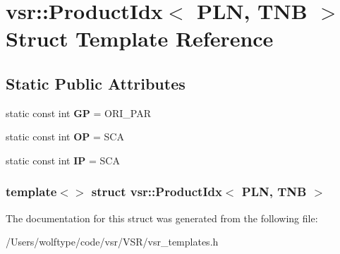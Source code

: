 \hypertarget{structvsr_1_1_product_idx_3_01_p_l_n_00_01_t_n_b_01_4}{\section{vsr\-:\-:Product\-Idx$<$ P\-L\-N, T\-N\-B $>$ Struct Template Reference}
\label{structvsr_1_1_product_idx_3_01_p_l_n_00_01_t_n_b_01_4}
}
\subsection*{Static Public Attributes}
\begin{DoxyCompactItemize}
\item 
\hypertarget{structvsr_1_1_product_idx_3_01_p_l_n_00_01_t_n_b_01_4_a2cfb0f629a8afe4cf45a4ff998809194}{static const int {\bfseries G\-P} = O\-R\-I\-\_\-\-P\-A\-R}\label{structvsr_1_1_product_idx_3_01_p_l_n_00_01_t_n_b_01_4_a2cfb0f629a8afe4cf45a4ff998809194}

\item 
\hypertarget{structvsr_1_1_product_idx_3_01_p_l_n_00_01_t_n_b_01_4_a140db72686024dfa7db167123621221c}{static const int {\bfseries O\-P} = S\-C\-A}\label{structvsr_1_1_product_idx_3_01_p_l_n_00_01_t_n_b_01_4_a140db72686024dfa7db167123621221c}

\item 
\hypertarget{structvsr_1_1_product_idx_3_01_p_l_n_00_01_t_n_b_01_4_a3f9387826dbceeb9a1a2ea53ae1502dc}{static const int {\bfseries I\-P} = S\-C\-A}\label{structvsr_1_1_product_idx_3_01_p_l_n_00_01_t_n_b_01_4_a3f9387826dbceeb9a1a2ea53ae1502dc}

\end{DoxyCompactItemize}
\subsubsection*{template$<$$>$ struct vsr\-::\-Product\-Idx$<$ P\-L\-N, T\-N\-B $>$}



The documentation for this struct was generated from the following file\-:\begin{DoxyCompactItemize}
\item 
/\-Users/wolftype/code/vsr/\-V\-S\-R/vsr\-\_\-templates.\-h\end{DoxyCompactItemize}

